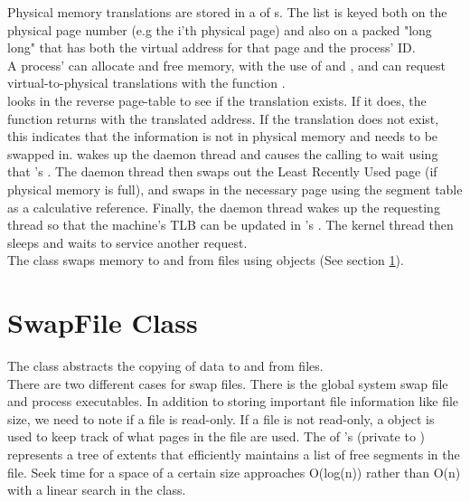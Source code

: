     Physical memory translations are stored in a  of
     s.  The list is keyed both
    on the physical page number (e.g the i'th physical page) and also
    on a packed "long long" that has both the virtual address for that
    page and the process' ID.\\

    A process'  can allocate and free memory, with the use
    of  and , and can request
    virtual-to-physical translations with the function .\\
    
     looks in the reverse page-table to see
    if the translation exists. If it does, the function returns
    with the translated address.  If the translation does not exist, this
    indicates that the information is not in physical memory and needs to
    be swapped in.  wakes up the 
    daemon thread and causes the calling  to wait using that 
    's . The
    daemon thread then swaps out the Least Recently Used page (if physical
    memory is full), and
    swaps in the necessary page using the segment table as a calculative reference.  
    Finally, the daemon thread wakes up the requesting thread so that the
    machine's TLB can be updated in 's .
    The kernel thread then sleeps and waits to service another
    request. \\

    The  class swaps memory to and from files using
     objects (See section \ref{xref:swapfile}).\\

  \section{SwapFile Class}
  \label{xref:swapfile}
    The  class abstracts the copying of data to and
    from files.\\
    
    There are two different cases for swap files.  There is the global system
    swap file and process executables.  In addition to storing important
    file information like file size, we need to note if a file is
    read-only. If a file is not read-only, a  object is used to
    keep track of what pages in the file are used.  The  of
    's 
    (private to ) represents a tree of extents that efficiently
    maintains a list of free segments in the file.  Seek time for a space of
    a certain size approaches O(log(n)) rather than O(n) with a linear search
    in the  class.\\
    
